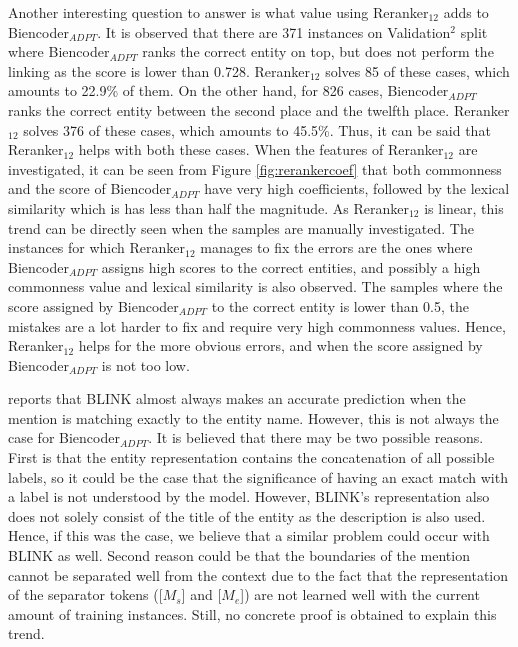 \documentclass{report}
\theoremstyle{definition}
\theoremstyle{remark}
\begin{document}
Another interesting question to answer is what value using Reranker$_{12}$ adds to \\ Biencoder$_{ADPT}$. It is observed that there are 371 instances on Validation$^2$ split where Biencoder$_{ADPT}$ ranks the correct entity on top, but does not perform the linking as the score is lower than 0.728. Reranker$_{12}$ solves 85 of these cases, which amounts to 22.9\% of them. On the other hand, for 826 cases, Biencoder$_{ADPT}$ ranks the correct entity between the second place and the twelfth place. Reranker$_{12}$ solves 376 of these cases, which amounts to 45.5\%. Thus, it can be said that Reranker$_{12}$ helps with both these cases. When the features of Reranker$_{12}$ are investigated, it can be seen from Figure \ref{fig:rerankercoef} that both commonness and the score of Biencoder$_{ADPT}$ have very high coefficients, followed by the lexical similarity which is has less than half the magnitude. As Reranker$_{12}$ is linear, this trend can be directly seen when the samples are manually investigated. The instances for which Reranker$_{12}$ manages to fix the errors are the ones where Biencoder$_{ADPT}$ assigns high scores to the correct entities, and possibly a high commonness value and lexical similarity is also observed. The samples where the score assigned by Biencoder$_{ADPT}$ to the correct entity is lower than 0.5, the mistakes are a lot harder to fix and require very high commonness values. Hence, Reranker$_{12}$ helps for the more obvious errors, and when the score assigned by Biencoder$_{ADPT}$ is not too low.

\cite{GENRE} reports that BLINK almost always makes an accurate prediction when the mention is matching exactly to the entity name. However, this is not always the case for Biencoder$_{ADPT}$. It is believed that there may be two possible reasons. First is that the entity representation contains the concatenation of all possible labels, so it could be the case that the significance of having an exact match with a label is not understood by the model. However, BLINK's representation also does not solely consist of the title of the entity as the description is also used. Hence, if this was the case, we believe that a similar problem could occur with BLINK as well. Second reason could be that the boundaries of the mention cannot be separated well from the context due to the fact that the representation of the separator tokens ([$M_s$] and [$M_e$]) are not learned well with the current amount of training instances. Still, no concrete proof is obtained to explain this trend.
\end{document}
